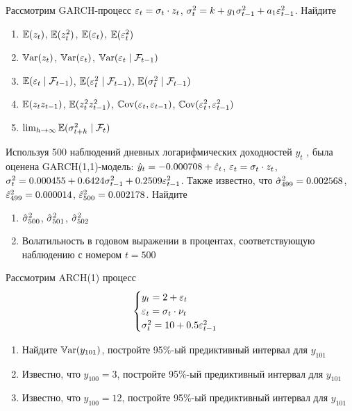 \begin{problem}
Рассмотрим GARCH-процесс $\varepsilon_t=\sigma_t \cdot z_t$, $\sigma^2_t=k+g_1\sigma^2_{t-1}+a_1\varepsilon^2_{t-1}$. Найдите
\begin{enumerate}
\item $\operatorname{\mathbb{E}}(z_t)$, $\operatorname{\mathbb{E}}(z_t^2)$, $\operatorname{\mathbb{E}}(\varepsilon_t)$, $\operatorname{\mathbb{E}}(\varepsilon_t^2)$
\item $\operatorname{\mathbb{V}\mathrm{ar}}(z_t)$, $\operatorname{\mathbb{V}\mathrm{ar}}(\varepsilon_t)$, $\operatorname{\mathbb{V}\mathrm{ar}}(\varepsilon_t \mid \mathcal{F}_{t-1})$
\item $\operatorname{\mathbb{E}}(\varepsilon_t \mid \mathcal{F}_{t-1})$, $\operatorname{\mathbb{E}}(\varepsilon_t^2 \mid \mathcal{F}_{t-1})$, $\operatorname{\mathbb{E}}(\sigma^2_t \mid \mathcal{F}_{t-1})$
\item $\operatorname{\mathbb{E}}(z_tz_{t-1})$, $\operatorname{\mathbb{E}}(z_t^2z_{t-1}^2)$, $\operatorname{\mathbb{C}\mathrm{ov}}(\varepsilon_t,\varepsilon_{t-1})$, $\operatorname{\mathbb{C}\mathrm{ov}}(\varepsilon_t^2,\varepsilon_{t-1}^2)$
\item $\lim_{h\to\infty} \operatorname{\mathbb{E}}(\sigma^2_{t+h} \mid \mathcal{F}_t)$
\end{enumerate}


\begin{sol}
\end{sol}
\end{problem}



\begin{problem}
Используя 500 наблюдений дневных логарифмических доходностей $y_t$ ,
была оценена GARCH(1,1)-модель: $\hat{y}_t=-0.000708+\hat{\varepsilon}_t$, $\varepsilon_t=\sigma_t \cdot z_t$, $\sigma^2_t=0.000455+0.6424\sigma^2_{t-1}+0.2509\varepsilon^2_{t-1}$. Также известно, что $\hat{\sigma}^2_{499}=0.002568$, $\hat{\varepsilon}^2_{499}=0.000014$, $\hat{\varepsilon}^2_{500}=0.002178$.
Найдите
\begin{enumerate}
\item  $\hat{\sigma}^2_{500}$, $\hat{\sigma}^2_{501}$, $\hat{\sigma}^2_{502}$
\item Волатильность в годовом выражении в процентах, соответствующую
наблюдению с номером $t = 500$
\end{enumerate}


\begin{sol}
\end{sol}
\end{problem}


\begin{problem}
Рассмотрим ARCH(1) процесс
\[
\begin{cases}
y_t = 2 + \varepsilon_t \\
\varepsilon_t = \sigma_t \cdot \nu_t \\
\sigma^2_t = 10 + 0.5\varepsilon_{t-1}^2
\end{cases}
\]

\begin{enumerate}
\item Найдите $\operatorname{\mathbb{V}\mathrm{ar}}(y_{101})$, постройте 95\%-ый предиктивный интервал для $y_{101}$
\item Известно, что $y_{100}=3$, постройте 95\%-ый предиктивный интервал для $y_{101}$
\item Известно, что $y_{100}=12$, постройте 95\%-ый предиктивный интервал для $y_{101}$
\end{enumerate}


\begin{sol}
\end{sol}
\end{problem}

